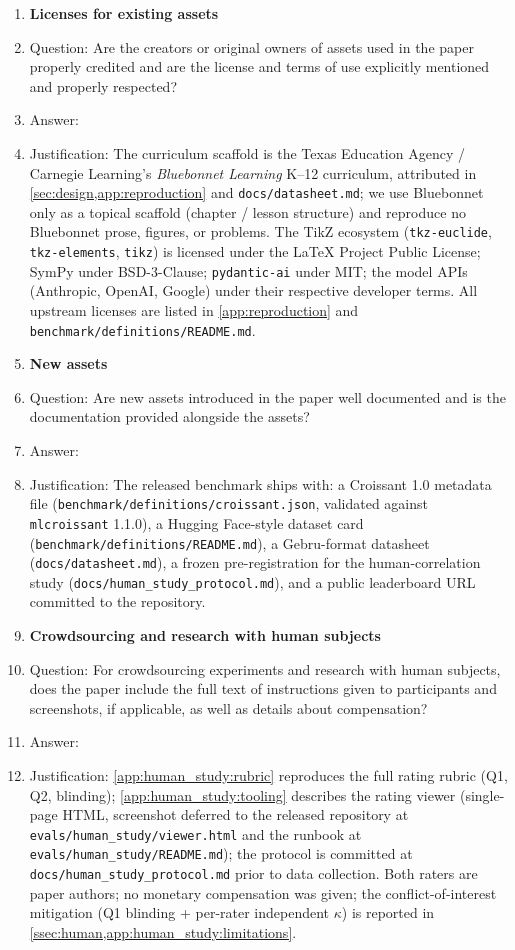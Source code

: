 \begin{enumerate}
\item {\bf Licenses for existing assets}
\item[] Question: Are the creators or original owners of assets used in the paper properly credited and are the license and terms of use explicitly mentioned and properly respected?
\item[] Answer: \answerYes{}
\item[] Justification: The curriculum scaffold is the Texas Education Agency / Carnegie Learning's \emph{Bluebonnet Learning} K--12 curriculum, attributed in \cref{sec:design,app:reproduction} and \texttt{docs/datasheet.md}; we use Bluebonnet only as a topical scaffold (chapter / lesson structure) and reproduce no Bluebonnet prose, figures, or problems. The TikZ ecosystem (\texttt{tkz-euclide}, \texttt{tkz-elements}, \texttt{tikz}) is licensed under the LaTeX Project Public License; SymPy under BSD-3-Clause; \texttt{pydantic-ai} under MIT; the model APIs (Anthropic, OpenAI, Google) under their respective developer terms. All upstream licenses are listed in \cref{app:reproduction} and \texttt{benchmark/definitions/README.md}.

\item {\bf New assets}
\item[] Question: Are new assets introduced in the paper well documented and is the documentation provided alongside the assets?
\item[] Answer: \answerYes{}
\item[] Justification: The released benchmark ships with: a Croissant 1.0 metadata file (\texttt{benchmark/definitions/croissant.json}, validated against \texttt{mlcroissant} 1.1.0), a Hugging Face-style dataset card (\texttt{benchmark/definitions/README.md}), a Gebru-format datasheet (\texttt{docs/datasheet.md}), a frozen pre-registration for the human-correlation study (\texttt{docs/human\_study\_protocol.md}), and a public leaderboard URL committed to the repository.

\item {\bf Crowdsourcing and research with human subjects}
\item[] Question: For crowdsourcing experiments and research with human subjects, does the paper include the full text of instructions given to participants and screenshots, if applicable, as well as details about compensation?
\item[] Answer: \answerYes{}
\item[] Justification: \cref{app:human_study:rubric} reproduces the full rating rubric (Q1, Q2, blinding); \cref{app:human_study:tooling} describes the rating viewer (single-page HTML, screenshot deferred to the released repository at \texttt{evals/human\_study/viewer.html} and the runbook at \texttt{evals/human\_study/README.md}); the protocol is committed at \texttt{docs/human\_study\_protocol.md} prior to data collection. Both raters are paper authors; no monetary compensation was given; the conflict-of-interest mitigation (Q1 blinding + per-rater independent $\kappa$) is reported in \cref{ssec:human,app:human_study:limitations}.


\end{enumerate}
